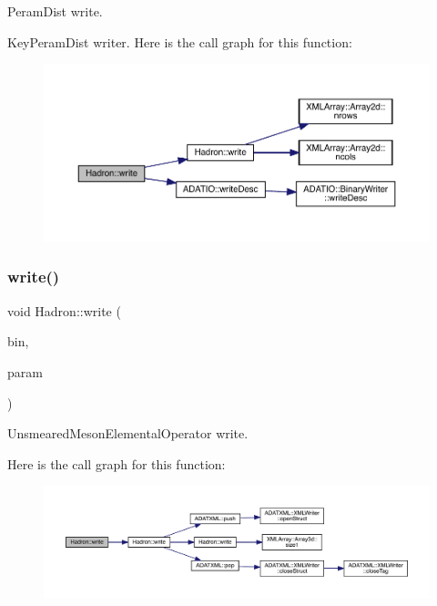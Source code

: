 Peram\+Dist write. 

Key\+Peram\+Dist writer. Here is the call graph for this function\+:
\nopagebreak
\begin{figure}[H]
\begin{center}
\leavevmode
\includegraphics[width=350pt]{d1/daf/namespaceHadron_a1f7e7b8c782fddd330a9f4491bd37e22_cgraph}
\end{center}
\end{figure}
\mbox{\label{namespaceHadron_ac88cbe3678a2276ee3dd2d55fff0cabf}} 
\subsubsection{\texorpdfstring{write()}{write()}\hspace{0.1cm}{\footnotesize\ttfamily [27/95]}}
{\footnotesize\ttfamily void Hadron\+::write (\begin{DoxyParamCaption}\item[{\mbox{\hyperlink{classADATIO_1_1BinaryWriter}{Binary\+Writer}} \&}]{bin,  }\item[{const \mbox{\hyperlink{structHadron_1_1KeyUnsmearedMesonElementalOperator__t}{Key\+Unsmeared\+Meson\+Elemental\+Operator\+\_\+t}} \&}]{param }\end{DoxyParamCaption})}



Unsmeared\+Meson\+Elemental\+Operator write. 

Here is the call graph for this function\+:
\nopagebreak
\begin{figure}[H]
\begin{center}
\leavevmode
\includegraphics[width=350pt]{d1/daf/namespaceHadron_ac88cbe3678a2276ee3dd2d55fff0cabf_cgraph}
\end{center}
\end{figure}
\mbox{\label{namespaceHadron_abf12b2168d7e3741fcc320bf4b8c53df}} 
